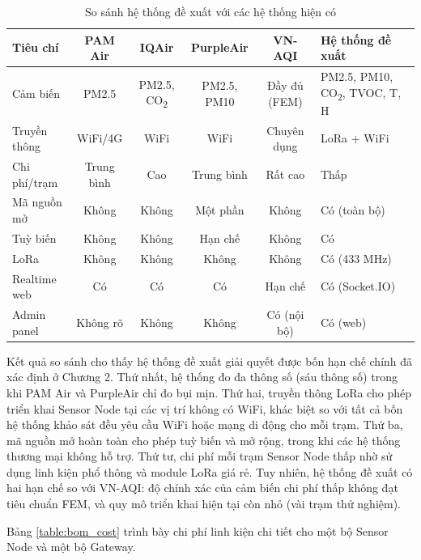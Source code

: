 \documentclass[../DoAn.tex]{subfiles}
\begin{document}
\begin{table}[H]
\centering
\caption{So sánh hệ thống đề xuất với các hệ thống hiện có}
\label{table:so_sanh_ket_qua}
\small
\begin{tabularx}{\textwidth}{|X|c|c|c|c|X|}
\hline
\textbf{Tiêu chí} & \textbf{PAM Air} & \textbf{IQAir} & \textbf{PurpleAir} & \textbf{VN-AQI} & \textbf{Hệ thống đề xuất} \\
\hline
Cảm biến & PM2.5 & PM2.5, CO\textsubscript{2} & PM2.5, PM10 & Đầy đủ (FEM) & PM2.5, PM10, CO\textsubscript{2}, TVOC, T, H \\
\hline
Truyền thông & WiFi/4G & WiFi & WiFi & Chuyên dụng & LoRa + WiFi \\
\hline
Chi phí/trạm & Trung bình & Cao & Trung bình & Rất cao & Thấp \\
\hline
Mã nguồn mở & Không & Không & Một phần & Không & Có (toàn bộ) \\
\hline
Tuỳ biến & Không & Không & Hạn chế & Không & Có \\
\hline
LoRa & Không & Không & Không & Không & Có (433 MHz) \\
\hline
Realtime web & Có & Có & Có & Hạn chế & Có (Socket.IO) \\
\hline
Admin panel & Không rõ & Không & Không & Có (nội bộ) & Có (web) \\
\hline
\end{tabularx}
\end{table}

Kết quả so sánh cho thấy hệ thống đề xuất giải quyết được bốn hạn chế chính đã xác định ở Chương 2. Thứ nhất, hệ thống đo đa thông số (sáu thông số) trong khi PAM Air và PurpleAir chỉ đo bụi mịn. Thứ hai, truyền thông LoRa cho phép triển khai Sensor Node tại các vị trí không có WiFi, khác biệt so với tất cả bốn hệ thống khảo sát đều yêu cầu WiFi hoặc mạng di động cho mỗi trạm. Thứ ba, mã nguồn mở hoàn toàn cho phép tuỳ biến và mở rộng, trong khi các hệ thống thương mại không hỗ trợ. Thứ tư, chi phí mỗi trạm Sensor Node thấp nhờ sử dụng linh kiện phổ thông và module LoRa giá rẻ. Tuy nhiên, hệ thống đề xuất có hai hạn chế so với VN-AQI: độ chính xác của cảm biến chi phí thấp không đạt tiêu chuẩn FEM, và quy mô triển khai hiện tại còn nhỏ (vài trạm thử nghiệm).

Bảng \ref{table:bom_cost} trình bày chi phí linh kiện chi tiết cho một bộ Sensor Node và một bộ Gateway.
\end{document}
